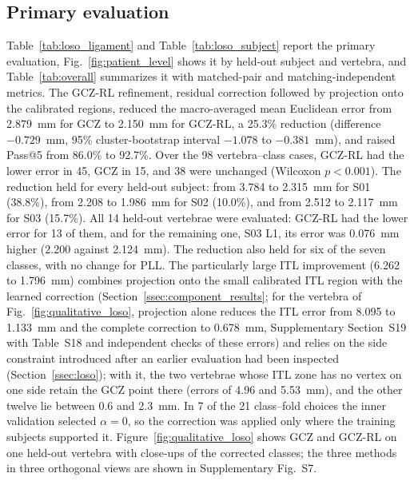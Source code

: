 \documentclass[5p,times,twocolumn,authoryear]{elsarticle}
\newif\ifhighlight
\newcommand{\rev}[1]{\ifhighlight{\color{revcolor}#1}\else#1\fi}
\begin{document}
\subsection{Primary evaluation}

Table~\ref{tab:loso_ligament} and Table~\ref{tab:loso_subject} report the primary evaluation\rev{, Fig.~\ref{fig:patient_level} shows it by held-out subject and vertebra, and Table~\ref{tab:overall} summarizes it with matched-pair and matching-independent metrics}. \rev{The GCZ-RL refinement, residual correction followed by projection onto the calibrated regions,} reduced the macro-averaged mean Euclidean error from 2.879~mm for GCZ to 2.150~mm for GCZ-RL, a 25.3\% reduction (difference $-0.729$~mm, 95\% cluster-bootstrap interval $-1.078$ to $-0.381$~mm), and raised Pass@5 from 86.0\% to 92.7\%. Over the 98 vertebra--class cases, GCZ-RL had the lower error in 45, GCZ in 15, and 38 were unchanged (Wilcoxon $p<0.001$). The reduction held for every held-out subject: from 3.784 to 2.315~mm for S01 (38.8\%), from 2.208 to 1.986~mm for S02 (\rev{10.0\%}), and from 2.512 to 2.117~mm for S03 (15.7\%). \rev{All 14 held-out vertebrae were evaluated: GCZ-RL had the lower error for 13 of them, and for the remaining one, S03 L1, its error was 0.076~mm higher (2.200 against 2.124~mm).} The reduction also held for six of the seven classes, with no change for PLL. The particularly large ITL improvement (6.262 to 1.796~mm) \rev{combines projection onto the small calibrated ITL region with the learned correction (Section~\ref{ssec:component_results}; for the vertebra of Fig.~\ref{fig:qualitative_loso}, projection alone reduces the ITL error from 8.095 to 1.133~mm and the complete correction to 0.678~mm, Supplementary Section~S19 with Table~S18 and independent checks of these errors) and relies on} the side constraint introduced after an earlier evaluation had been inspected (Section~\ref{ssec:loso}); with it, the two vertebrae whose ITL zone has no vertex on one side retain the GCZ point there (errors of 4.96 and 5.53~mm), and the other twelve lie between 0.6 and 2.3~mm. In 7 of the 21 class--fold choices the inner validation selected $\alpha=0$, so the correction was applied only where the training subjects supported it. \rev{Figure~\ref{fig:qualitative_loso} shows GCZ and GCZ-RL on one held-out vertebra with close-ups of the corrected classes; the three methods in three orthogonal views are shown in Supplementary Fig.~S7.}
\end{document}
